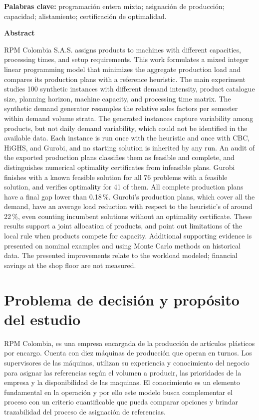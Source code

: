 \documentclass[12pt,a4paper,oneside]{article}
\begin{document}
\textbf{Palabras clave:} programación entera mixta; asignación de producción; capacidad; alistamiento; certificación de optimalidad.
\par\medskip
{}
\noindent\textbf{Abstract}\par\smallskip
\noindent
RPM Colombia S.A.S. assigns products to machines with different capacities, processing times, and setup requirements. This work formulates a mixed integer linear programming model that minimizes the aggregate production load and compares its production plans with a reference heuristic. The main experiment studies 100 synthetic instances with different demand intensity, product catalogue size, planning horizon, machine capacity, and processing time matrix. The synthetic demand generator resamples the relative sales factors per semester within demand volume strata. The generated instances capture variability among products, but not daily demand variability, which could not be identified in the available data. Each instance is run once with the heuristic and once with CBC, HiGHS, and Gurobi, and no starting solution is inherited by any run. An audit of the exported production plans classifies them as feasible and complete, and distinguishes numerical optimality certificates from infeasible plans. Gurobi finishes with a known feasible solution for all 76 problems with a feasible solution, and verifies optimality for 41 of them. All complete production plans have a final gap lower than 0.18\,\%. Gurobi's production plans, which cover all the demand, have an average load reduction with respect to the heuristic's of around 22\,\%, even counting incumbent solutions without an optimality certificate. These results support a joint allocation of products, and point out limitations of the local rule when products compete for capacity. Additional supporting evidence is presented on nominal examples and using Monte Carlo methods on historical data. The presented improvements relate to the workload modeled; financial savings at the shop floor are not measured.

\section{Problema de decisión y propósito del estudio}
RPM Colombia, es una empresa encargada de la producción de artículos plásticos por encargo. Cuenta con diez máquinas de producción que operan en turnos. Los supervisores de las máquinas, utilizan su experiencia y conocimiento del negocio para asignar las referencias según el volumen a producir, las prioridades de la empresa y la disponibilidad de las maquinas. El conocimiento es un elemento fundamental en la operación y por ello este modelo busca complementar el proceso con un criterio cuantificable que pueda comparar opciones y brindar trazabilidad del proceso de asignación de referencias.
\end{document}
